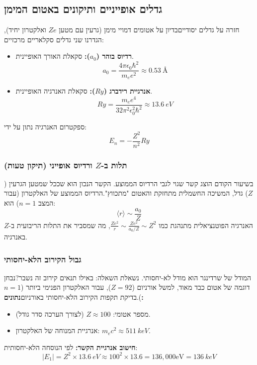 \subsection{גדלים אופייניים ותיקונים באטום המימן}
\begin{summarybox}
    {חזרה על גדלים יסודיים}בדיון על אטומים דמויי מימן (גרעין עם מטען $Ze$ ואלקטרון
    יחיד), הגדרנו שני גדלים סקלאריים מרכזיים:
    \begin{itemize}
        \item \textbf{רדיוס בוהר ($a_{0}$):} סקאלת האורך האופיינית.
            \begin{equation}
                a_{0} = \frac{4\pi\epsilon_{0} \hbar^{2}}{m_{e} e^{2}}\approx \SI
                {0.53}{\text{Å}}
            \end{equation}

        \item \textbf{אנרגיית רידברג ($Ry$):} סקאלת האנרגיה האופיינית.
            \begin{equation}
                Ry = \frac{m_{e} e^{4}}{32\pi^{2}\epsilon_{0}^{2} \hbar^{2}}\approx
                \SI{13.6}{eV}
            \end{equation}
    \end{itemize}ספקטרום האנרגיה נתון על ידי:
    \begin{equation}
        E_{n} = -\frac{Z^{2}}{n^{2}}Ry
    \end{equation}
\end{summarybox}
\subsubsection{תלות ב-$Z$ ורדיוס אופייני (תיקון טעות)}
בשיעור הקודם הוצג קשר שגוי לגבי הרדיוס הממוצע. הקשר הנכון הוא שככל שמטען הגרעין ($Z$)
גדל, המשיכה החשמלית מתחזקת והאטום "מתכווץ".הרדיוס הממוצע של האלקטרון (עבור המצב $n
=1$) הוא:
\begin{equation}
    \langle r \rangle \sim \frac{a_{0}}{Z}
\end{equation}האנרגיה הפוטנציאלית מתנהגת כמו
$\frac{Ze^{2}}{r}\sim \frac{Ze^{2}}{a_{0}/Z}\sim Z^{2}$, מה שמסביר את התלות הריבועית
ב-$Z$ באנרגיה.
\subsubsection{גבול הקירוב הלא-יחסותי}
המודל של שרדינגר הוא מודל לא-יחסותי. נשאלת השאלה: באילו תנאים קירוב זה נשבר?נבחן
דוגמה של אטום כבד מאוד, למשל אורניום ($Z=92$), עבור האלקטרון הפנימי ביותר ($n=1$).בדיקת
תקפות הקירוב הלא-יחסותי באורניום\textbf{נתונים:}
\begin{itemize}
    \item מספר אטומי: $Z \approx 100$ (לצורך הערכה סדר גודל).

    \item אנרגיית המנוחה של האלקטרון: $m_{e} c^{2} \approx \SI{511}{keV}$.
\end{itemize}\textbf{חישוב אנרגיית הקשר:} לפי הנוסחה הלא-יחסותית:
\begin{equation}
    |E_{1}| = Z^{2} \times \SI{13.6}{eV}\approx 100^{2} \times 13.6 = 136,000 \text{
    eV}= \SI{136}{keV}
\end{equation}

